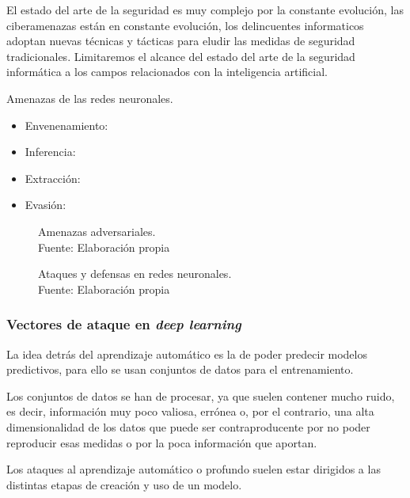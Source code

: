 El estado del arte de la seguridad es muy complejo por la constante evolución, las ciberamenazas están en constante evolución, los delincuentes informaticos adoptan nuevas técnicas y tácticas para eludir las medidas de seguridad tradicionales.
Limitaremos el alcance del estado del arte de la seguridad informática a los campos relacionados con la inteligencia artificial.

Amenazas de las redes neuronales.

\begin{itemize}
  \item Envenenamiento:
  \item Inferencia:
  \item Extracción:
  \item Evasión:
\end{itemize}

\begin{figure}[H]
  \centering
  \centerline{}
  \caption{Amenazas adversariales. \\Fuente: Elaboración propia}
  \label{fig:art-adversarial-threats}
\end{figure}



\begin{figure}[H]
  \centering
  \centerline{}
  \caption{Ataques y defensas en redes neuronales. \\Fuente: Elaboración propia}
  \label{fig:art-for-red-and-blue-teams}
\end{figure}


\subsubsection{Vectores de ataque en \textit{deep learning}}

La idea detrás del aprendizaje automático es la de poder predecir modelos predictivos, para ello se usan conjuntos de datos para el entrenamiento.

Los conjuntos de datos se han de procesar, ya que suelen contener mucho ruido, es decir, información muy poco valiosa, errónea o, por el contrario, una alta dimensionalidad de los datos que puede ser contraproducente por no poder reproducir esas medidas o por la poca información que aportan.

Los ataques al aprendizaje automático o profundo suelen estar dirigidos a las distintas etapas de creación y uso de un modelo.

